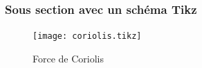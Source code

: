 \subsubsection{Sous section avec un schéma Tikz}

\blindtext[5]
\begin{figure}[ht]
    \centering
    \texttt{[image: coriolis.tikz]}
    \caption{Force de Coriolis}%
    \label{fig:coriolis}
\end{figure}


